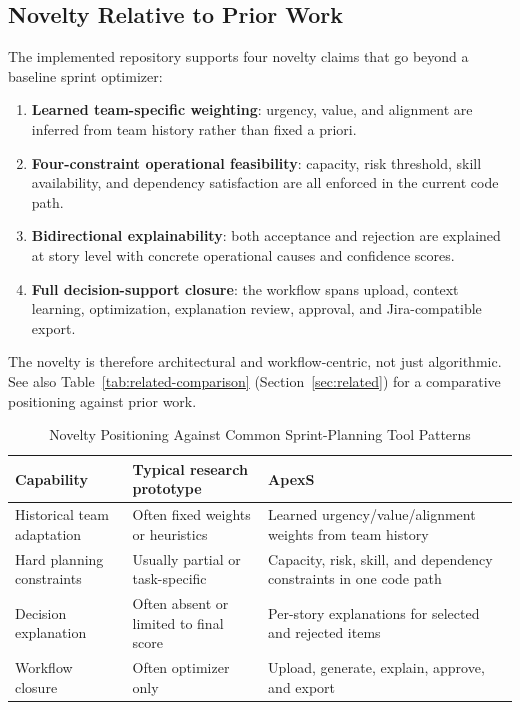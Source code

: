 \documentclass[conference]{IEEEtran}
\begin{document}
\subsection{Novelty Relative to Prior Work}

The implemented repository supports four novelty claims that go beyond a baseline
sprint optimizer:
\begin{enumerate}[leftmargin=*,itemsep=1pt,topsep=2pt]
\item \textbf{Learned team-specific weighting}: urgency, value, and alignment are
      inferred from team history rather than fixed a priori.
\item \textbf{Four-constraint operational feasibility}: capacity, risk threshold,
      skill availability, and dependency satisfaction are all enforced in the
      current code path.
\item \textbf{Bidirectional explainability}: both acceptance and rejection are
      explained at story level with concrete operational causes and confidence
      scores.
\item \textbf{Full decision-support closure}: the workflow spans upload, context
      learning, optimization, explanation review, approval, and Jira-compatible
      export.
\end{enumerate}
The novelty is therefore architectural and workflow-centric, not just algorithmic.
See also Table~\ref{tab:related-comparison} (Section~\ref{sec:related}) for a
comparative positioning against prior work.

\begin{table}[t]
\caption{Novelty Positioning Against Common Sprint-Planning Tool Patterns}
\label{tab:novelty-summary}
\centering\small
\begin{tabularx}{\columnwidth}{lYY}
\toprule
Capability & Typical research prototype & ApexS \\
\midrule
Historical team adaptation &
  Often fixed weights or heuristics &
  Learned urgency/value/alignment weights from team history \\
Hard planning constraints &
  Usually partial or task-specific &
  Capacity, risk, skill, and dependency constraints in one code path \\
Decision explanation &
  Often absent or limited to final score &
  Per-story explanations for selected and rejected items \\
Workflow closure &
  Often optimizer only &
  Upload, generate, explain, approve, and export \\
\bottomrule
\end{tabularx}
\end{table}
\end{document}
